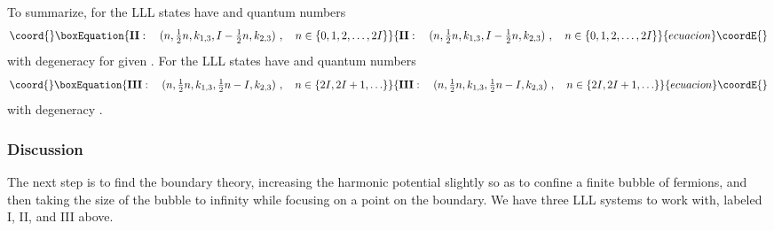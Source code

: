\documentclass[a4paper,12pt]{article}
\providecommand{\half}{{\textstyle \frac{1}{2}}}
\begin{document}
To summarize, for
\coordHE{} the LLL states have
\coordHE{} and quantum numbers
\begin{equation}\coord{}\boxEquation{
{\bf II}:\quad (n, \half n, k_{1,3}, I - \half n , k_{2,3})\ ,\quad
n \in \{0,1,2,\ldots , 2I\}
\label{lll2}
}{
{\bf II}:\quad (n, \half n, k_{1,3}, I - \half n , k_{2,3})\ ,\quad
n \in \{0,1,2,\ldots , 2I\}
}{ecuacion}\coordE{}\end{equation}
with degeneracy \coordHE{} for given \coordHE{}.  
For \coordHE{} the LLL states have \coordHE{} and quantum numbers
\begin{equation}\coord{}\boxEquation{
{\bf III}:\quad (n, \half n, k_{1,3}, \half n - I , k_{2,3})\ ,\quad
n \in \{2I,2I+1,\ldots \}
\label{lll3}
}{
{\bf III}:\quad (n, \half n, k_{1,3}, \half n - I , k_{2,3})\ ,\quad
n \in \{2I,2I+1,\ldots \}
}{ecuacion}\coordE{}\end{equation}
with degeneracy \coordHE{}.  

\subsubsection{Discussion}

The next step is to find the boundary theory, increasing the harmonic
potential slightly so as to confine a finite bubble of fermions, and
then taking the size of the bubble to infinity while focusing on a
point on the boundary.  We have three LLL systems to work with, labeled
I, II, and III above.  
\end{document}
